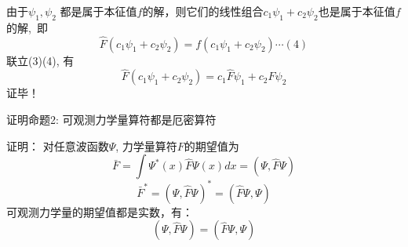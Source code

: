 \begin{frame} 
    由于$\psi_1, \psi_2$ 都是属于本征值$f$的解，则它们的线性组合$c_1\psi_1+c_2\psi_2$也是属于本征值$f$的解, 即
    $$\hat{F}(c_1\psi_1+c_2\psi_2)=f(c_1\psi_1+c_2\psi_2)\cdots (4)$$
    联立(3)(4), 有
    $$\hat{F}(c_1\psi_1+c_2\psi_2)=c_1\hat{F}\psi_1+c_2\hat{F}\psi_2$$
    证毕！
\end{frame} 

\begin{frame} 
    \begin{tcolorbox1}{证明命题2:}
        可观测力学量算符都是厄密算符  
    \end{tcolorbox1}
    \alert{证明：}
        对任意波函数$\Psi$, 力学量算符$F$的期望值为\\
        $$\bar{F}=\int \Psi^{*}(x) \hat{F} \Psi(x) d x=(\Psi,\hat{F} \Psi) $$
        $$\bar{F}^*=(\Psi, \hat{F} \Psi)^* = (\hat{F}\Psi, \Psi) $$
        可观测力学量的期望值都是实数，有：\\
        $$(\Psi,\hat{F}\Psi)=(\hat{F} \Psi, \Psi) $$
\end{frame} 

